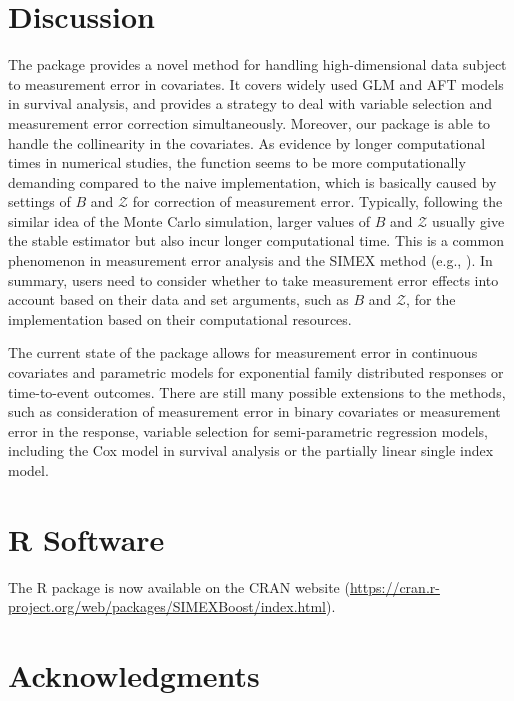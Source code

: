  
\section{Discussion}

The package  provides a novel {method for handling} high-dimensional data subject to measurement error in covariates. It covers widely used GLM and AFT models in survival analysis, and provides a  strategy to deal with variable selection and  measurement error correction simultaneously. Moreover, our package is able to handle the collinearity in the covariates. {As evidence by longer computational times in numerical studies, the function  seems to be more computationally demanding compared to the naive implementation, which is basically} caused by settings of $B$ and $\mathcal{Z}$ for correction of measurement error. Typically, following the similar idea of the Monte Carlo simulation, larger values of $B$ and $\mathcal{Z}$ usually give the stable estimator {but also incur} longer computational time. This is a common phenomenon in measurement error analysis and the SIMEX method (e.g., \citealp{Yi:2017}). {In summary, users need to consider whether to take measurement error effects into account based on their data and set arguments, such as $B$ and $\mathcal{Z}$, for the implementation based on their computational resources.}

The current {state of the package allows for} measurement error in continuous covariates and parametric models for exponential family distributed responses or time-to-event outcomes. There are still many {possible extensions to the methods}, such as consideration of measurement error in binary covariates or measurement error in the response, variable selection for semi-parametric regression models, including the Cox model in survival analysis or the partially linear single index model.


\section*{R Software}

The R package  is now available on the CRAN website (\url{https://cran.r-project.org/web/packages/SIMEXBoost/index.html}).


\section*{Acknowledgments}

